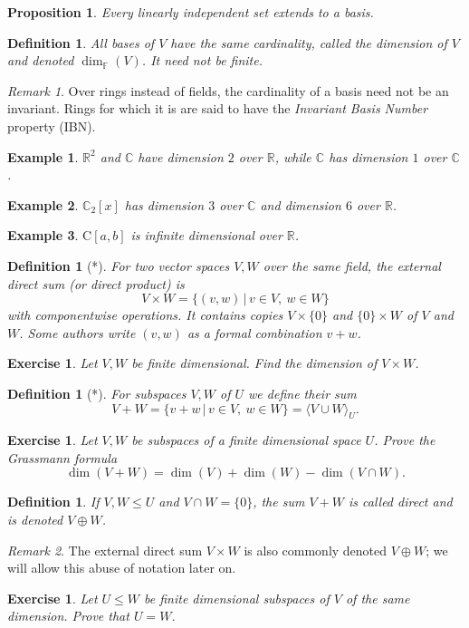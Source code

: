 \documentclass[12pt]{article}
\newcommand{\double}{\hspace{2pt}}
\theoremstyle{breakplain}
\newtheorem{prop}[theorem]{Proposition}
\theoremstyle{breakdef}
\newtheorem{definition}[theorem]{Definition}
\newtheorem*{example}{Example}
\newtheorem{ex}[subsubsection]{Exercise}
\theoremstyle{remark}
\newtheorem*{remark}{Remark}
\begin{document}
\begin{prop}
    Every linearly independent set extends to a basis.
\end{prop}
\begin{definition}
    All bases of $V$ have the same cardinality, called the \emph{dimension} of $V$ and denoted $\dim_\mathbb{F}(V)$. It need not be finite.
\end{definition}
\begin{remark}
    Over rings instead of fields, the cardinality of a basis need not be an invariant. Rings for which it is are said to have the \emph{Invariant Basis Number} property (IBN).
\end{remark}
\begin{example}
    $\mathbb{R}^2$ and $\mathbb{C}$ have dimension $2$ over $\mathbb{R}$, while $\mathbb{C}$ has dimension $1$ over $\mathbb{C}$.
\end{example}
\begin{example}
    $\mathbb{C}_2[x]$ has dimension $3$ over $\mathbb{C}$ and dimension $6$ over $\mathbb{R}$.
\end{example}
\begin{example}
    $\mathrm{C}[a,b]$ is infinite dimensional over $\mathbb{R}$.
\end{example}
\begin{definition}[*]
    For two vector spaces $V,W$ over the same field, the \emph{external direct sum} (or \emph{direct product}) is
    \[V\times W=\{ (v,w) \double | \double v\in V,\ w\in W\}\]
    with componentwise operations. It contains copies $V\times\{0\}$ and $\{0\}\times W$ of $V$ and $W$. Some authors write $(v,w)$ as a formal combination $v+w$.
\end{definition}
\begin{ex}
    Let $V,W$ be finite dimensional. Find the dimension of $V\times W$.
\end{ex}
\begin{definition}[*]
    For subspaces $V,W$ of $U$ we define their \emph{sum}
    \[V+ W=\{ v+w \double | \double v\in V,\ w\in W \}=\langle V \cup W\rangle_U.\]
\end{definition}
\begin{ex}
    Let $V,W$ be subspaces of a finite dimensional space $U$. Prove the \emph{Grassmann formula}
    \[\dim(V+W)=\dim(V)+\dim(W)-\dim(V\cap W).\]
\end{ex}
\begin{definition}
    If $V,W\leq U$ and $V\cap W=\{0\}$, the sum $V+W$ is called \emph{direct} and is denoted $V\oplus W$.
\end{definition}
\begin{remark}
    The external direct sum $V\times W$ is also commonly denoted $V\oplus W$; we will allow this abuse of notation later on.
\end{remark}
\begin{ex}
    Let $U\leq W$ be finite dimensional subspaces of $V$ of the same dimension. Prove that $U=W$.
\end{ex}
\end{document}
